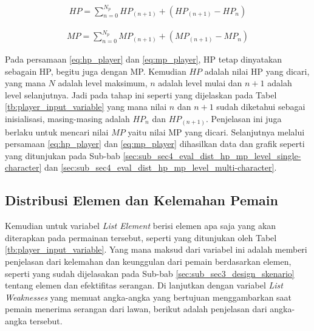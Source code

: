 \begin{equation}\label{eq:hp_player}
	\begin{split}
		HP = \sum_{n = 0}^{N_{p}} HP_{(n + 1)} + \left(HP_{(n + 1)} - HP_{n} \right)
	\end{split}
\end{equation}

\begin{equation}\label{eq:mp_player}
	\begin{split}
		MP = \sum_{n = 0}^{N_{p}} MP_{(n + 1)} + \left(MP_{(n + 1)} - MP_{n} \right)
	\end{split}
\end{equation}

Pada persamaan \ref{eq:hp_player} dan \ref{eq:mp_player}, HP tetap dinyatakan sebagain HP, begitu juga dengan MP. Kemudian $HP$ adalah nilai HP yang dicari, yang mana $N$ adalah level maksimum, $n$ adalah level mulai dan $n + 1$ adalah level selanjutnya. Jadi pada tahap ini seperti yang dijelaskan pada Tabel \ref{tb:player_input_variable} yang mana nilai $n$ dan $n + 1$ sudah diketahui sebagai inisialisasi, masing-masing adalah $HP_{n}$ dan $HP_{(n + 1)}$. Penjelasan ini juga berlaku untuk mencari nilai $MP$ yaitu nilai MP yang dicari. Selanjutnya melalui persamaan \ref{eq:hp_player} dan \ref{eq:mp_player} dihasilkan data dan grafik seperti yang ditunjukan pada Sub-bab \ref{sec:sub_sec4_eval_dist_hp_mp_level_single-character} dan \ref{sec:sub_sec4_eval_dist_hp_mp_level_multi-character}.
\vspace{1ex}

\subsection{Distribusi Elemen dan Kelemahan Pemain}
\label{sec:sub_sec3_list_element_player}
\vspace{1ex}

Kemudian untuk variabel \textit{List Element} berisi elemen apa saja yang akan diterapkan pada permainan tersebut, seperti yang ditunjukan oleh Tabel \ref{tb:player_input_variable}. Yang mana maksud dari variabel ini adalah memberi penjelasan dari kelemahan dan keunggulan dari pemain berdasarkan elemen, seperti yang sudah dijelasakan pada Sub-bab \ref{sec:sub_sec3_design_skenario} tentang elemen dan efektifitas serangan. Di lanjutkan dengan variabel \textit{List Weaknesses} yang memuat angka-angka yang bertujuan menggambarkan saat pemain menerima serangan dari lawan, berikut adalah penjelasan dari angka-angka tersebut.

